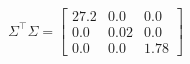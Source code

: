 \documentclass[preview]{standalone}
\begin{document}
\begin{align*}
\Sigma^\top\Sigma=\left[\begin{matrix}27.2&0.0&0.0\\0.0&0.02&0.0\\0.0&0.0&1.78\end{matrix}\right]
\end{align*}
\end{document}
